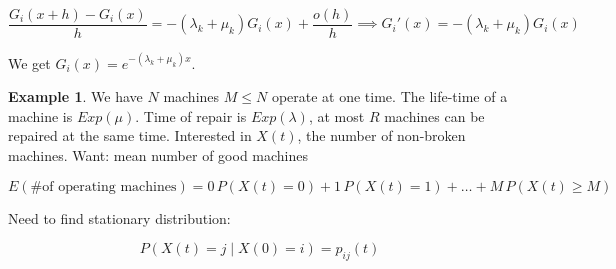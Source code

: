 \documentclass{article}
\theoremstyle{definition}
\newtheorem{exmp}{Example}[section]
\begin{document}
$$
\frac{G_i(x+h)-G_i(x)}{h} = - (\lambda_k + \mu_k) G_i(x) + \frac{o(h)}{h} \implies G_i'(x) = - (\lambda_k + \mu_k) G_i(x)
$$

We get $G_i(x) = e^{-(\lambda_k + \mu_k) x}$.

\begin{exmp}
We have $N$ machines $M \le N$ operate at one time. The life-time of a machine is $Exp(\mu)$. Time of repair is $Exp(\lambda)$, at most $R$ machines can be repaired at the same time. Interested in $X(t)$, the number of non-broken machines.
Want: mean number of good machines

$$
E(\text{\# of operating machines}) = 0 \, P(X(t) = 0) + 1 \, P(X(t) = 1) + \ldots + M \, P(X(t) \ge M )
$$

Need to find stationary distribution:

$$
P(X(t) = j \mid X(0) = i) = p_{ij}(t) 
$$

\end{exmp}
\end{document}
